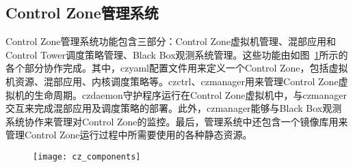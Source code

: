 \subsection{Control Zone管理系统}


Control Zone管理系统功能包含三部分：Control Zone虚拟机管理、混部应用和Control Tower调度策略管理、Black Box观测系统管理。这些功能由如图~\ref{fig:cz_components}所示的各个部分协作完成。其中，czyaml配置文件用来定义一个Control Zone，包括虚拟机资源、混部应用、内核调度策略等。czctrl、czmanager用来管理Control Zone虚拟机的生命周期。czdaemon守护程序运行在Control Zone虚拟机中，与czmanager交互来完成混部应用及调度策略的部署。此外，czmanager能够与Black Box观测系统协作来管理对Control Zone的监控。最后，管理系统中还包含一个镜像库用来管理Control Zone运行过程中所需要使用的各种静态资源。

\begin{figure}[!htbp]
    \centering
    \texttt{[image: cz\_components]}
    \label{fig:cz_components}
\end{figure}

